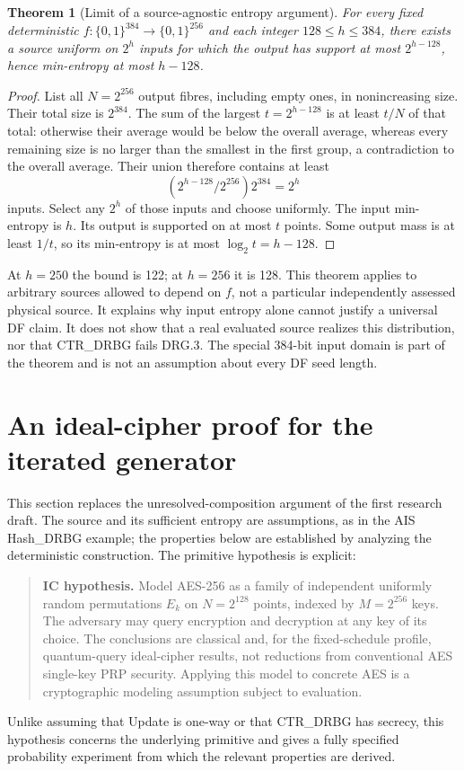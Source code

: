 \documentclass[11 pt,a 4 paper]{article}
\newtheorem{theorem}{Theorem}
\newcommand{\bits}{\{0,1\}}
\begin{document}
\begin{theorem}[Limit of a source-agnostic entropy argument]\label{thm:source}
For every fixed deterministic $ f:\bits^{384}\to\bits^{256}$ and each integer $128\leq h\leq 384$, there exists a source uniform on $2^h $ inputs for which the output has support at most $2^{h-128}$, hence min-entropy at most $ h-128$.
\end{theorem}
\begin{proof}
List all $ N=2^{256}$ output fibres, including empty ones, in nonincreasing size. Their total size is $2^{384}$. The sum of the largest $ t=2^{h-128}$ is at least $ t/N $ of that total: otherwise their average would be below the overall average, whereas every remaining size is no larger than the smallest in the first group, a contradiction to the overall average. Their union therefore contains at least
\[
 (2^{h-128}/2^{256})2^{384}=2^h
\]
inputs. Select any $2^h $ of those inputs and choose uniformly. The input min-entropy is $ h $. Its output is supported on at most $ t $ points. Some output mass is at least $1/t $, so its min-entropy is at most $\log_2 t=h-128$.
\end{proof}
At $ h=250$ the bound is 122; at $ h=256$ it is 128. This theorem applies to arbitrary sources allowed to depend on $ f $, not a particular independently assessed physical source. It explains why input entropy alone cannot justify a universal DF claim. It does not show that a real evaluated source realizes this distribution, nor that CTR\_DRBG fails DRG.3. The special 384-bit input domain is part of the theorem and is not an assumption about every DF seed length.

\section{An ideal-cipher proof for the iterated generator}
\label{sec:proof}
This section replaces the unresolved-composition argument of the first research draft. The source and its sufficient entropy are assumptions, as in the AIS Hash\_DRBG example; the properties below are established by analyzing the deterministic construction. The primitive hypothesis is explicit:
\begin{quote}
\textbf{IC hypothesis.} Model AES-256 as a family of independent uniformly random permutations $ E_k $ on $ N=2^{128}$ points, indexed by $ M=2^{256}$ keys. The adversary may query encryption and decryption at any key of its choice. The conclusions are classical and, for the fixed-schedule profile, quantum-query ideal-cipher results, not reductions from conventional AES single-key PRP security. Applying this model to concrete AES is a cryptographic modeling assumption subject to evaluation.
\end{quote}
Unlike assuming that Update is one-way or that CTR\_DRBG has secrecy, this hypothesis concerns the underlying primitive and gives a fully specified probability experiment from which the relevant properties are derived.
\end{document}
